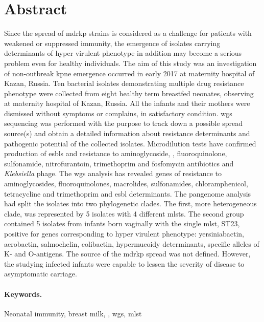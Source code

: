 \section*{Abstract}\label{sec:abstract}

Since the spread of \gls{mdrkp} strains is considered as a challenge for patients with weakened or suppressed immunity,
the emergence of isolates carrying determinants of hyper virulent phenotype in addition may become a serious
problem even for healthy individuals.
The aim of this study was an investigation of non-outbreak \gls{kpne} emergence occurred in early 2017
at maternity hospital of Kazan, Russia.
Ten bacterial isolates demonstrating multiple drug resistance phenotype were collected from eight
healthy term breastfed neonates, observing at maternity hospital of Kazan, Russia.
All the infants and their mothers were dismissed without symptoms or complains, in satisfactory
condition.
\Gls{wgs} sequencing was performed with the purpose to track down a possible spread source(s) and
obtain a detailed information about resistance determinants and pathogenic potential of the
collected isolates.
Microdilution tests have confirmed production of \glspl{esbl} and resistance to aminoglycoside, \betalactam,
fluoroquinolone, sulfonamide, nitrofurantoin, trimethoprim and fosfomycin antibiotics and \textit{Klebsiella} phage.
The \gls{wgs} analysis has revealed genes of resistance to aminoglycosides, fluoroquinolones, macrolides,
sulfonamides, chloramphenicol, tetracycline and trimethoprim and \gls{esbl} determinants.
The pangenome analysis had split the isolates into two phylogenetic clades.
The first, more heterogeneous clade, was represented by 5 isolates with 4 different \glspl{mlst}.
The second group contained 5 isolates from infants born vaginally with the single \gls{mlst}, ST23, positive for
genes corresponding to hyper virulent phenotype: yersiniabactin, aerobactin, salmochelin, colibactin, hypermucoidy
determinants, specific alleles of K- and O-antigens.
The source of the \gls{mdrkp} spread was not defined.
However, the studying infected infants were capable to lessen the severity of disease to
asymptomatic carriage.

\paragraph{Keywords.}
Neonatal immunity, breast milk, , \glsdesc{wgs}, \glsdesc{mlst}
\glsresetall
